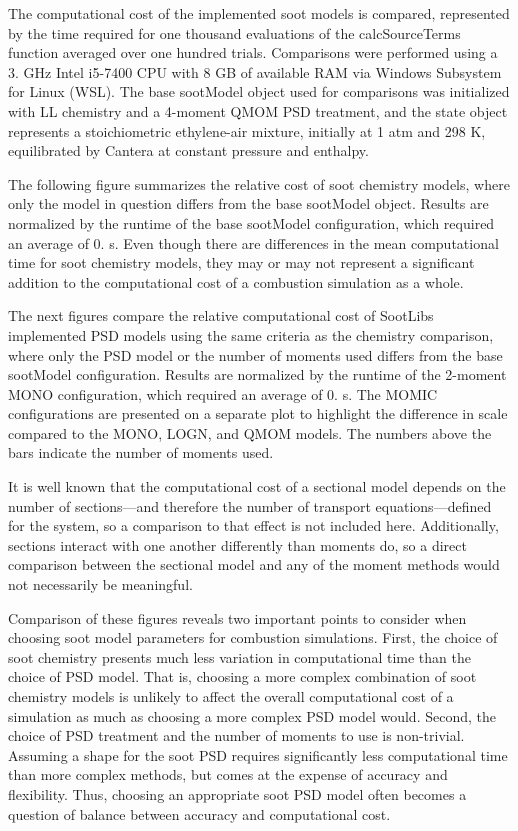The computational cost of the implemented soot models is compared, represented by the time required for one thousand evaluations of the {\ttfamily calc\+Source\+Terms} function averaged over one hundred trials. Comparisons were performed using a 3. GHz Intel i5-\/7400 CPU with 8 GB of available RAM via Windows Subsystem for Linux (WSL). The base {\ttfamily soot\+Model} object used for comparisons was initialized with {\ttfamily LL} chemistry and a 4-\/moment {\ttfamily QMOM} PSD treatment, and the {\ttfamily state} object represents a stoichiometric ethylene-\/air mixture, initially at 1 atm and 298 K, equilibrated by Cantera at constant pressure and enthalpy.

The following figure summarizes the relative cost of soot chemistry models, where only the model in question differs from the base {\ttfamily soot\+Model} object. Results are normalized by the runtime of the base {\ttfamily soot\+Model} configuration, which required an average of 0. s. Even though there are differences in the mean computational time for soot chemistry models, they may or may not represent a significant addition to the computational cost of a combustion simulation as a whole.



The next figures compare the relative computational cost of Soot\+Lib\textquotesingle{}s implemented PSD models using the same criteria as the chemistry comparison, where only the PSD model or the number of moments used differs from the base {\ttfamily soot\+Model} configuration. Results are normalized by the runtime of the 2-\/moment {\ttfamily MONO} configuration, which required an average of 0. s. The {\ttfamily MOMIC} configurations are presented on a separate plot to highlight the difference in scale compared to the {\ttfamily MONO}, {\ttfamily LOGN}, and {\ttfamily QMOM} models. The numbers above the bars indicate the number of moments used.





It is well known that the computational cost of a sectional model depends on the number of sections---and therefore the number of transport equations---defined for the system, so a comparison to that effect is not included here. Additionally, sections interact with one another differently than moments do, so a direct comparison between the sectional model and any of the moment methods would not necessarily be meaningful.

Comparison of these figures reveals two important points to consider when choosing soot model parameters for combustion simulations. First, the choice of soot chemistry presents much less variation in computational time than the choice of PSD model. That is, choosing a more complex combination of soot chemistry models is unlikely to affect the overall computational cost of a simulation as much as choosing a more complex PSD model would. Second, the choice of PSD treatment and the number of moments to use is non-\/trivial. Assuming a shape for the soot PSD requires significantly less computational time than more complex methods, but comes at the expense of accuracy and flexibility. Thus, choosing an appropriate soot PSD model often becomes a question of balance between accuracy and computational cost. 
